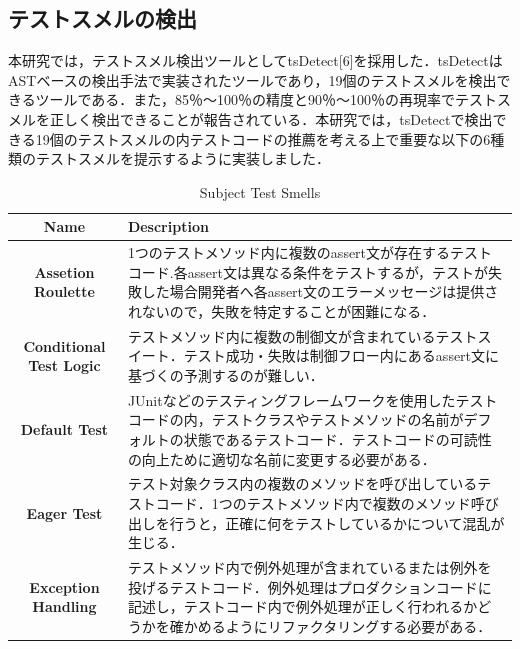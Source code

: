 \documentclass[conference]{IEEEtran}
\begin{document}
\subsection{テストスメルの検出}
本研究では，テストスメル検出ツールとしてtsDetect[6]を採用した．tsDetectはASTベースの検出手法で実装されたツールであり，19個のテストスメルを検出できるツールである．また，85％〜100％の精度と90％〜100％の再現率でテストスメルを正しく検出できることが報告されている．本研究では，tsDetectで検出できる19個のテストスメルの内テストコードの推薦を考える上で重要な以下の6種類のテストスメルを提示するように実装しました．

\begin{table}[hbtp]
\caption{Subject Test Smells}
\begin{tabular}{|c|p{5.5cm}|}
\hline
\textbf{Name}                   & \textbf{Description}                                                                                                       \\ \hline
\textbf{Assetion Roulette}        & 1つのテストメソッド内に複数のassert文が存在するテストコード.各assert文は異なる条件をテストするが，テストが失敗した場合開発者へ各assert文のエラーメッセージは提供されないので，失敗を特定することが困難になる．  \\ \hline
\textbf{Conditional Test Logic} &テストメソッド内に複数の制御文が含まれているテストスイート．テスト成功・失敗は制御フロー内にあるassert文に基づくの予測するのが難しい．                                                                                                                                                                                                           \\ \hline
\textbf{Default Test}            &JUnitなどのテスティングフレームワークを使用したテストコードの内，テストクラスやテストメソッドの名前がデフォルトの状態であるテストコード．テストコードの可読性の向上ために適切な名前に変更する必要がある．                                                                                                      \\ \hline
\textbf{Eager Test }             &テスト対象クラス内の複数のメソッドを呼び出しているテストコード．1つのテストメソッド内で複数のメソッド呼び出しを行うと，正確に何をテストしているかについて混乱が生じる．                                                                                                         \\ \hline
\textbf{Exception Handling}      & テストメソッド内で例外処理が含まれているまたは例外を投げるテストコード．例外処理はプロダクションコードに記述し，テストコード内で例外処理が正しく行われるかどうかを確かめるようにリファクタリングする必要がある．                                                                                                    \\ \hline

\end{tabular}
\end{table}
\end{document}
